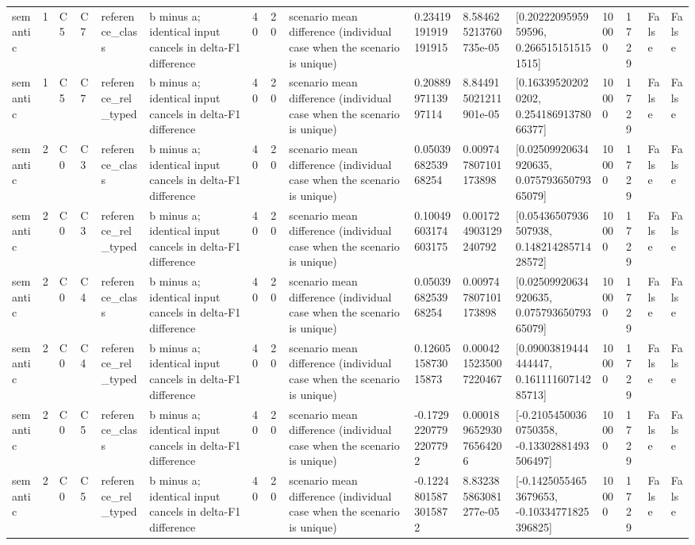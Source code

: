 \begin{tabular}{llllllllllllllll}
semantic & 1 & C5 & C7 & reference\_class & b minus a; identical input cancels in delta-F1 difference & 40 & 20 & scenario mean difference (individual case when the scenario is unique) & 0.23419191919191915 & 8.584625213760735e-05 & [0.2022209595959596, 0.2665151515151515] & 10000 & 1729 & False & False \\
semantic & 1 & C5 & C7 & reference\_rel\_typed & b minus a; identical input cancels in delta-F1 difference & 40 & 20 & scenario mean difference (individual case when the scenario is unique) & 0.2088997113997114 & 8.844915021211901e-05 & [0.163395202020202, 0.25418691378066377] & 10000 & 1729 & False & False \\
semantic & 2 & C0 & C3 & reference\_class & b minus a; identical input cancels in delta-F1 difference & 40 & 20 & scenario mean difference (individual case when the scenario is unique) & 0.0503968253968254 & 0.009747807101173898 & [0.02509920634920635, 0.07579365079365079] & 10000 & 1729 & False & False \\
semantic & 2 & C0 & C3 & reference\_rel\_typed & b minus a; identical input cancels in delta-F1 difference & 40 & 20 & scenario mean difference (individual case when the scenario is unique) & 0.10049603174603175 & 0.001724903129240792 & [0.05436507936507938, 0.14821428571428572] & 10000 & 1729 & False & False \\
semantic & 2 & C0 & C4 & reference\_class & b minus a; identical input cancels in delta-F1 difference & 40 & 20 & scenario mean difference (individual case when the scenario is unique) & 0.0503968253968254 & 0.009747807101173898 & [0.02509920634920635, 0.07579365079365079] & 10000 & 1729 & False & False \\
semantic & 2 & C0 & C4 & reference\_rel\_typed & b minus a; identical input cancels in delta-F1 difference & 40 & 20 & scenario mean difference (individual case when the scenario is unique) & 0.1260515873015873 & 0.0004215235007220467 & [0.09003819444444447, 0.16111160714285713] & 10000 & 1729 & False & False \\
semantic & 2 & C0 & C5 & reference\_class & b minus a; identical input cancels in delta-F1 difference & 40 & 20 & scenario mean difference (individual case when the scenario is unique) & -0.17292207792207792 & 0.00018965293076564206 & [-0.21054500360750358, -0.13302881493506497] & 10000 & 1729 & False & False \\
semantic & 2 & C0 & C5 & reference\_rel\_typed & b minus a; identical input cancels in delta-F1 difference & 40 & 20 & scenario mean difference (individual case when the scenario is unique) & -0.12248015873015872 & 8.832385863081277e-05 & [-0.14250554653679653, -0.10334771825396825] & 10000 & 1729 & False & False \\

\end{tabular}
